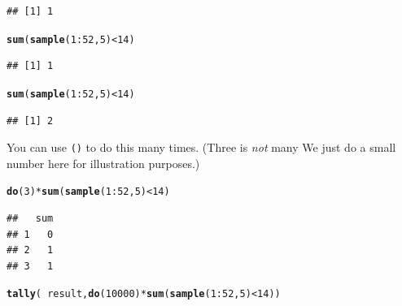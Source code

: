 \documentclass[twoside]{book}\usepackage[]{graphicx}\usepackage[]{xcolor}
\makeatletter
\newcommand{\hlnum}[1]{\textcolor[rgb]{0.686,0.059,0.569}{#1}}%
\newcommand{\hlopt}[1]{\textcolor[rgb]{0,0,0}{#1}}%
\newcommand{\hlstd}[1]{\textcolor[rgb]{0.345,0.345,0.345}{#1}}%
\newcommand{\hlkwd}[1]{\textcolor[rgb]{0.737,0.353,0.396}{\textbf{#1}}}%
\newenvironment{kframe}{%
 \def\at@end@of@kframe{}%
 \ifinner\ifhmode%
  \def\at@end@of@kframe{\end{minipage}}%
  \begin{minipage}{\columnwidth}%
 \fi\fi%
 \def\FrameCommand##1{\hskip\@totalleftmargin \hskip-\fboxsep
 \colorbox{shadecolor}{##1}\hskip-\fboxsep
     \hskip-\linewidth \hskip-\@totalleftmargin \hskip\columnwidth}%
 \MakeFramed {\advance\hsize-\width
   \@totalleftmargin\z@ \linewidth\hsize
   \@setminipage}}%
 {\par\unskip\endMakeFramed%
 \at@end@of@kframe}
\newenvironment{knitrout}{}{} %
\newcommand{\Rindex}[1]{\index{\texttt{#1}}}
\newcommand{\function}[1]{{\color{purple!75!blue}\texttt{\StrSubstitute{#1}{()}{}()}}\Rindex{#1}}
\makeatother
\begin{document}
\begin{problem}
\begin{knitrout}
\begin{kframe}
\begin{alltt}
\end{alltt}
\begin{verbatim}
## [1] 1
\end{verbatim}
\begin{alltt}
\hlkwd{sum}\hlstd{(} \hlkwd{sample}\hlstd{(}\hlnum{1}\hlopt{:}\hlnum{52}\hlstd{,} \hlnum{5}\hlstd{)} \hlopt{<} \hlnum{14} \hlstd{)}
\end{alltt}
\begin{verbatim}
## [1] 1
\end{verbatim}
\begin{alltt}
\hlkwd{sum}\hlstd{(} \hlkwd{sample}\hlstd{(}\hlnum{1}\hlopt{:}\hlnum{52}\hlstd{,} \hlnum{5}\hlstd{)} \hlopt{<} \hlnum{14} \hlstd{)}
\end{alltt}
\begin{verbatim}
## [1] 2
\end{verbatim}
\end{kframe}
\end{knitrout}
	You can use \function{do()} to do this many times. (Three is \emph{not} many\! We just do a small number here 
	for illustration purposes.)
\begin{knitrout}
\color{fgcolor}\begin{kframe}
\begin{alltt}
\hlkwd{do}\hlstd{(}\hlnum{3}\hlstd{)} \hlopt{*} \hlkwd{sum}\hlstd{(} \hlkwd{sample}\hlstd{(} \hlnum{1}\hlopt{:}\hlnum{52}\hlstd{,} \hlnum{5} \hlstd{)} \hlopt{<} \hlnum{14} \hlstd{)}
\end{alltt}
\begin{verbatim}
##   sum
## 1   0
## 2   1
## 3   1
\end{verbatim}
\end{kframe}
\end{knitrout}
\end{problem}

\begin{solution}
\begin{knitrout}
\color{fgcolor}\begin{kframe}
\begin{alltt}
\hlkwd{tally}\hlstd{(} \hlopt{~} \hlstd{result,} \hlkwd{do}\hlstd{(}\hlnum{10000}\hlstd{)} \hlopt{*} \hlkwd{sum}\hlstd{(}\hlkwd{sample}\hlstd{(}\hlnum{1}\hlopt{:}\hlnum{52}\hlstd{,} \hlnum{5}\hlstd{)} \hlopt{<} \hlnum{14}\hlstd{) )}
\end{alltt}


{\ttfamily\noindent\bfseries\color{errorcolor}{\#\# Error in eval(x, data, env): object 'result' not found}}\end{kframe}
\end{knitrout}
\end{solution}
\end{document}
